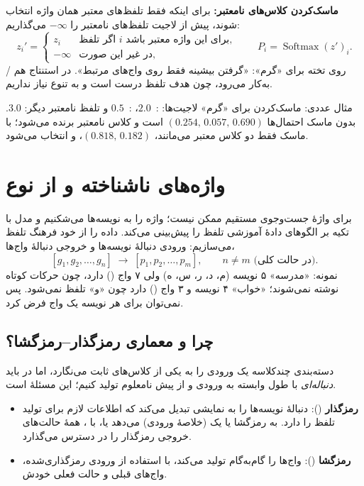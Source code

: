 \textbf{ماسک‌کردن کلاس‌های نامعتبر:} برای اینکه فقط تلفظ‌های معتبر همان واژه انتخاب شوند، پیش از  لاجیت تلفظ‌های نامعتبر را $-\infty$ می‌گذاریم:
\[
z_i'=\begin{cases} z_i & \text{اگر تلفظ } i \text{ برای این واژه معتبر باشد},\\ -\infty & \text{در غیر این صورت,}\end{cases}
\qquad P_i=\operatorname{Softmax}(z')_i .
\]
روی تخته برای «گرم»: «گرفتن بیشینه فقط روی واج‌های مرتبط». در استنتاج هم / به‌کار می‌رود، چون هدف تلفظ درست است و به تنوع نیاز نداریم.

\begin{addedbox}{مثال عددی: ماسک‌کردن}
برای «گرم» لاجیت‌ها: :~$2.0$، :~$0.5$ و تلفظ نامعتبر دیگر: $3.0$. بدون ماسک احتمال‌ها $(0.254,\,0.057,\,0.690)$ است و کلاس نامعتبر برنده می‌شود؛ با ماسک فقط دو کلاس معتبر می‌مانند، $(0.818,\,0.182)$، و  انتخاب می‌شود.
\end{addedbox}

\section{واژه‌های ناشناخته و  از نوع }

برای واژهٔ  جست‌وجوی مستقیم ممکن نیست؛ واژه را به نویسه‌ها می‌شکنیم و مدل با تکیه بر الگوهای دادهٔ آموزشی تلفظ را پیش‌بینی می‌کند. داده را از خود فرهنگ تلفظ می‌سازیم: ورودی دنبالهٔ نویسه‌ها و خروجی دنبالهٔ واج‌ها،
\[
[g_1,g_2,\dots,g_n]\;\longrightarrow\;[p_1,p_2,\dots,p_m],\qquad n\neq m \text{ (در حالت کلی)}.
\]
نمونه: «مدرسه» ۵ نویسه (م، د، ر، س، ه) ولی ۷ واج () دارد، چون حرکات کوتاه نوشته نمی‌شوند؛ «خواب» ۴ نویسه و ۳ واج () دارد چون «و» تلفظ نمی‌شود. پس نمی‌توان برای هر نویسه یک واج فرض کرد.

\subsection{چرا  و معماری رمزگذار–رمزگشا؟}
دسته‌بندی چندکلاسه یک ورودی را به یکی از کلاس‌های ثابت می‌نگارد، اما در  باید \emph{دنباله‌ای} با طول وابسته به ورودی و از پیش نامعلوم تولید کنیم؛ این مسئلهٔ  است.
\begin{itemize}
  \item \textbf{رمزگذار} (): دنبالهٔ نویسه‌ها را به نمایشی تبدیل می‌کند که اطلاعات لازم برای تولید تلفظ را دارد. به رمزگشا یا یک  (خلاصهٔ ورودی) می‌دهد یا، با ، همهٔ حالت‌های خروجی رمزگذار را در دسترس می‌گذارد.
  \item \textbf{رمزگشا} (): واج‌ها را گام‌به‌گام تولید می‌کند، با استفاده از ورودی رمزگذاری‌شده، واج‌های قبلی و حالت فعلی خودش.
\end{itemize}

